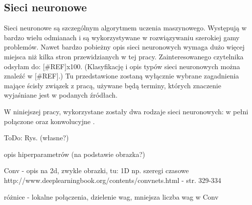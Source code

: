 \subsection{Sieci neuronowe}
\label{subsec:nn}

Sieci neuronowe są szczególnym algorytmem uczenia maszynowego. Występują w bardzo wielu odmianach i są wykorzystywane w rozwiązywaniu szerokiej gamy problemów. Nawet bardzo pobieżny opis sieci neuronowych wymaga dużo więcej miejsca niż kilka stron przewidzianych w tej pracy. Zainteresowanego czytelnika odsyłam do: [\#REF]x100. (Klasyfikację i opis typów sieci neuronowych można znaleźć w [\#REF].) Tu przedstawione zostaną wyłącznie wybrane zagadnienia mające ścisły związek z pracą, używane będą terminy, których znaczenie wyjaśniane jest w podanych źródłach.

W niniejszej pracy, wykorzystane zostały dwa rodzaje sieci neuronowych: w pełni połączone  oraz konwolucyjne . 

ToDo: Rys. (własne?) 

opis hiperparametrów (na podstawie obrazka?)

Conv - opis na 2d, zwykle obrazki, tu: 1D np. szeregi czasowe
http://www.deeplearningbook.org/contents/convnets.html - str. 329-334

różnice - lokalne połączenia, dzielenie wag, mniejsza liczba wag w Conv

